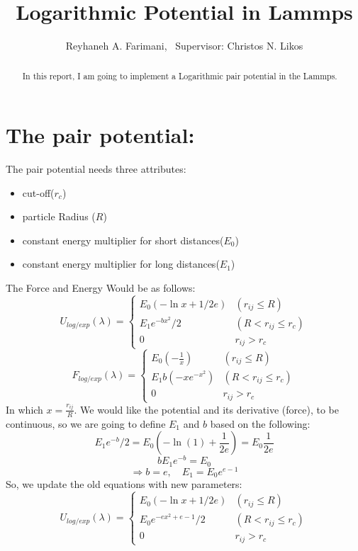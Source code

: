 \documentclass{article}
\title{Logarithmic Potential in Lammps}
\author{Reyhaneh A. Farimani, \ Supervisor: Christos N. Likos}
\begin{document}
\maketitle

\begin{abstract}
In this report, I am going to implement a Logarithmic pair potential in the Lammps. 
\end{abstract}
\section{The pair potential:}
The pair potential needs three attributes:
\begin{itemize}
    \item cut-off($r_c$)
    \item particle Radius ($R$)
    \item constant energy multiplier for short distances($E_0$)
    \item constant energy multiplier for long distances($E_1$)
\end{itemize}
The Force and Energy Would be as follows:
\begin{equation}
    	U_{log/exp}(\lambda) =      
	\begin{cases}
		E_0 (-\ln x + 1/2e)
  & (r_{ij}\leq R)
  \\
    E_1e^{-bx^2}/2 
  & (R<r_{ij}\leq r_c)
  \\ 0 
  &
  r_{ij} > r_c
	\end{cases}
\end{equation}
\begin{equation}
    	F_{log/exp}(\lambda) =      
	\begin{cases}
		E_0 (-\frac{1}{x})
  & (r_{ij}\leq R)
  \\
		E_1 b (-x e^{-x^2})
  & (R<r_{ij}\leq r_c)
  \\ 0 
  &
  r_{ij} > r_c
	\end{cases}
\end{equation}
In which $x = \frac{r_{ij}}{R}$.
We would like the potential and its derivative (force), to be continuous, so we are going to define $E_1$ and $b$ based on the following:
\[
E_1 e^{-b} / 2 = E_0 (-\ln(1) + \frac{1}{2e})  = E_0 \frac{1}{2e}
\]
\[
 b E_1 e^{-b} = E_0
\]
\begin{equation}
    \Rightarrow b = e,\quad E_1 = E_0 e^{e-1} 
\end{equation}
So, we update the old equations with new parameters:
\begin{equation}
    	U_{log/exp}(\lambda) =      
	\begin{cases}
		E_0 (-\ln x + 1/2e)
  & (r_{ij}\leq R)
  \\
    E_0 e^{-ex^2 +e -1}/2 
  & (R<r_{ij}\leq r_c)
  \\ 0 
  &
  r_{ij} > r_c
	\end{cases}
\end{equation}
\end{document}
